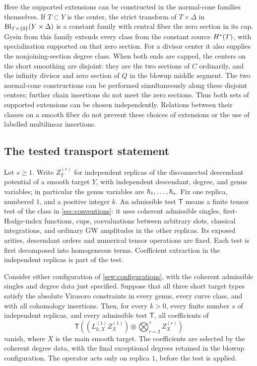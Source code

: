 Here the supported extensions can be constructed in the normal-cone
families themselves.  If $T\subset Y$ is the center, the strict
transform of $T\times\Delta$ in
$\operatorname{Bl}_{T\times\{0\}}(Y\times\Delta)$ is a constant family with central
fiber the zero section in its cap.  Gysin from this family extends
every class from the constant source $H^*(T)$, with specialization
supported on that zero section.  For a divisor center it also supplies
the nonjoining-section degree class.  When both ends are capped, the
centers on the short smoothing are disjoint: they are the two sections
of $C$ ordinarily, and the infinity divisor and zero section of $Q$ in
the blowup middle segment.  The two normal-cone constructions can be
performed simultaneously along these disjoint centers; further chain
insertions do not meet the zero sections.  Thus both sets of supported
extensions can be chosen independently.  Relations between their
classes on a smooth fiber do not prevent these choices of extensions
or the use of labelled multilinear insertions.

\subsection{The tested transport statement}

Let $s\geq 1$.  Write $Z_Y^{(r)}$ for independent replicas of the
disconnected descendant potential of a smooth target $Y$, with
independent descendant, degree, and genus variables; in particular the
genus variables are $\hbar_1,\ldots,\hbar_s$.  Fix one replica, numbered $1$,
and a positive integer $k$.  An admissible test $\mathsf T$ means a
finite tensor test of the class in \cref{sec:conventions}: it uses
coherent admissible singles, first-Hodge-index functions, cups,
coevaluations between arbitrary slots, classical integrations, and
ordinary GW amplitudes in the other replicas.  Its exposed arities,
descendant orders and numerical tensor operations are fixed.  Each
test is first decomposed into homogeneous terms.  Coefficient
extraction in the independent replicas is part of the test.

\begin{theorem}\label{sew:transport}
Consider either configuration of \cref{sew:configurations}, with the
coherent admissible singles and degree data just specified.  Suppose that all
three short target types satisfy the absolute Virasoro constraints in
every genus, every curve class, and with all cohomology insertions.
Then, for every $k>0$, every finite number $s$ of independent replicas,
and every admissible test $\mathsf T$, all coefficients of
\begin{equation}\label{sew:tested-error}
 \mathsf T\left(
   (L_{k,X}^{(1)}Z_X^{(1)})
       \otimes\bigotimes_{r=2}^{s} Z_X^{(r)}
 \right)
\end{equation}
vanish, where $X$ is the main smooth target.  The coefficients are
selected by the coherent degree data, with the final exceptional
degrees retained in the blowup configuration.  The operator acts only
on replica $1$, before the test is applied.
\end{theorem}


